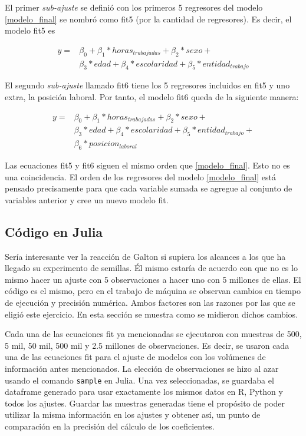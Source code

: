El primer \textit{sub-ajuste} se definió con los primeros 5 regresores del modelo \ref{modelo_final} se nombró como \textsf{fit5} (por la cantidad de regresores). Es decir, el modelo \textsf{fit5} es 

\begin{equation*}
    \begin{aligned}
 	y =& \beta_0 + \beta_1*horas_{trabajadas} + \beta_2*sexo + \\
    	&\beta_3*edad + \beta_4*escolaridad + \beta_5*entidad_{trabajo} 
    \end{aligned}
\end{equation*}


El segundo \textit{sub-ajuste} llamado \textsf{fit6} tiene los 5 regresores incluidos en \textsf{fit5} y uno extra, la posición laboral. Por tanto, el modelo \textsf{fit6} queda de la siguiente manera: 

\begin{equation*}
    \begin{aligned}
    	y =& \beta_0 + \beta_1*horas_{trabajadas} + \beta_2*sexo + \\
    	&\beta_3*edad + \beta_4*escolaridad + \beta_5*entidad_{trabajo} + \\
    	& \beta_6*posicion_{laboral}
    \end{aligned}
\end{equation*}

Las ecuaciones \textsf{fit5} y \textsf{fit6} siguen el mismo orden que \ref{modelo_final}. Esto no es una coincidencia. El orden de los regresores del modelo \ref{modelo_final} está pensado precisamente para que cada variable sumada se agregue al conjunto de variables anterior y cree un nuevo modelo \textsf{fit}.

\subsection{Código en Julia}

Sería interesante ver la reacción de Galton si supiera los alcances a los que ha llegado su experimento de semillas. Él mismo estaría de acuerdo con que no es lo mismo hacer un ajuste con 5 observaciones a hacer uno con 5 millones de ellas. El código es el mismo, pero en el trabajo de máquina se observan cambios en tiempo de ejecución y precisión numérica. Ambos factores son las razones por las que se eligió este ejercicio. En esta sección se muestra como se midieron dichos cambios.

Cada una de las ecuaciones \textsf{fit} ya mencionadas se ejecutaron con muestras de 500, 5 mil, 50 mil, 500 mil y 2.5 millones de observaciones. Es decir, se usaron cada una de las ecuaciones \textsf{fit} para el ajuste de modelos con los volúmenes de información antes mencionados. La elección de observaciones se hizo al azar usando el comando \texttt{sample} en \textsf{Julia}. Una vez seleccionadas, se guardaba el dataframe generado para usar exactamente los mismos datos en \textsf{R}, \textsf{Python} y todos los ajustes. Guardar las muestras generadas tiene el propósito de poder utilizar la misma información en los ajustes y obtener así, un punto de comparación en la precisión del cálculo de los coeficientes. 

